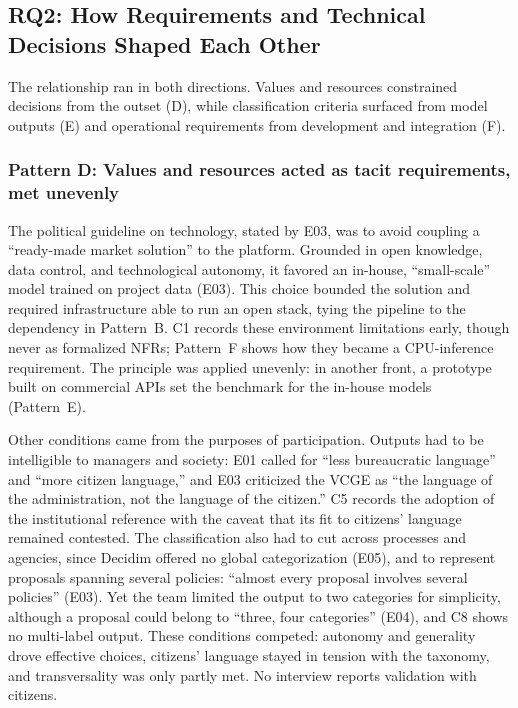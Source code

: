 \documentclass[sigconf,nonacm]{acmart}
\begin{document}
\subsection{RQ2: How Requirements and Technical Decisions Shaped Each Other}
\label{sec:rq2}

The relationship ran in both directions. Values and resources constrained decisions from the outset (D), while classification criteria surfaced from model outputs (E) and operational requirements from development and integration (F).

\subsubsection{Pattern D: Values and resources acted as tacit requirements, met unevenly}
\label{sec:pd}

The political guideline on technology, stated by E03, was to avoid coupling a ``ready-made market solution'' to the platform. Grounded in open knowledge, data control, and technological autonomy, it favored an in-house, ``small-scale'' model trained on project data (E03). This choice bounded the solution and required infrastructure able to run an open stack, tying the pipeline to the dependency in Pattern~B. C1 records these environment limitations early, though never as formalized NFRs; Pattern~F shows how they became a CPU-inference requirement. The principle was applied unevenly: in another front, a prototype built on commercial APIs set the benchmark for the in-house models (Pattern~E).

Other conditions came from the purposes of participation. Outputs had to be intelligible to managers and society: E01 called for ``less bureaucratic language'' and ``more citizen language,'' and E03 criticized the VCGE as ``the language of the administration, not the language of the citizen.'' C5 records the adoption of the institutional reference with the caveat that its fit to citizens' language remained contested. The classification also had to cut across processes and agencies, since Decidim offered no global categorization (E05), and to represent proposals spanning several policies: ``almost every proposal involves several policies'' (E03). Yet the team limited the output to two categories for simplicity, although a proposal could belong to ``three, four categories'' (E04), and C8 shows no multi-label output. These conditions competed: autonomy and generality drove effective choices, citizens' language stayed in tension with the taxonomy, and transversality was only partly met. No interview reports validation with citizens.
\end{document}
